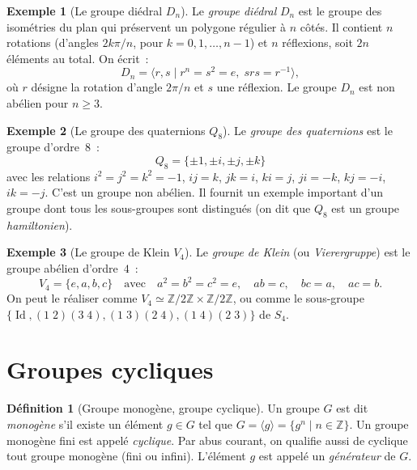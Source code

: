 \documentclass[12pt,a4paper,openany]{book}
\theoremstyle{definition}
\newtheorem{definition}{Définition}[chapter]
\newtheorem{exemple}{Exemple}[chapter]
\newcommand{\Z}{\mathbb{Z}}
\DeclareMathOperator{\Id}{Id}
\newcommand{\iso}{\simeq}
\newcommand{\gen}[1]{\langle #1 \rangle}
\begin{document}
\begin{exemple}[Le groupe diédral $D_n$]
\label{ex:Dn}
Le \emph{groupe diédral} $D_n$ est le groupe des isométries du plan qui préservent un
polygone régulier à $n$ côtés. Il contient $n$ rotations (d'angles $2k\pi/n$, pour $k =
0, 1, \ldots, n-1$) et $n$ réflexions, soit $2n$ éléments au total. On écrit~:
\[
  D_n = \gen{r, s \mid r^n = s^2 = e, \; srs = r^{-1}},
\]
où $r$ désigne la rotation d'angle $2\pi/n$ et $s$ une réflexion. Le groupe $D_n$ est
non abélien pour $n \geq 3$.
\end{exemple}

\begin{exemple}[Le groupe des quaternions $Q_8$]
\label{ex:Q8}
Le \emph{groupe des quaternions} est le groupe d'ordre~$8$~:
\[
  Q_8 = \{\pm 1, \pm i, \pm j, \pm k\}
\]
avec les relations $i^2 = j^2 = k^2 = -1$, $ij = k$, $jk = i$, $ki = j$,
$ji = -k$, $kj = -i$, $ik = -j$. C'est un groupe non abélien. Il fournit un
exemple important d'un groupe dont tous les sous-groupes sont distingués (on dit que
$Q_8$ est un groupe \emph{hamiltonien}).
\end{exemple}

\begin{exemple}[Le groupe de Klein $V_4$]
\label{ex:V4}
Le \emph{groupe de Klein} (ou \emph{Vierergruppe}) est le groupe abélien d'ordre~$4$~:
\[
  V_4 = \{e, a, b, c\} \quad \text{avec} \quad a^2 = b^2 = c^2 = e, \quad ab = c, \quad
  bc = a, \quad ac = b.
\]
On peut le réaliser comme $V_4 \iso \Z/2\Z \times \Z/2\Z$, ou comme le sous-groupe
$\{\Id, (1\;2)(3\;4), (1\;3)(2\;4), (1\;4)(2\;3)\}$ de $S_4$.
\end{exemple}

\section{Groupes cycliques}
\label{sec:ch1-cycliques}

\begin{definition}[Groupe monogène, groupe cyclique]
\label{def:cyclique}
Un groupe $G$ est dit \emph{monogène} s'il existe un élément $g \in G$ tel que $G =
\gen{g} = \{g^n \mid n \in \Z\}$. Un groupe monogène fini est appelé \emph{cyclique}.
Par abus courant, on qualifie aussi de cyclique tout groupe monogène (fini ou infini).
L'élément $g$ est appelé un \emph{générateur} de $G$.
\end{definition}
\end{document}
